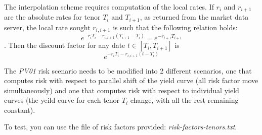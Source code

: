 \documentclass[10pt]{article}
\begin{document}
The interpolation scheme requires computation of the local rates. If $r_i$ and $r_{i+1}$ are the absolute rates for tenor $T_i$ and $T_{i+1}$, as returned from the market data server, the local rate sought $r_{i,i+1}$ is such that the following relation holds:
 $$e^{-r_iT_i-r_{i,i+1}(T_{i+1}-T_i)}=e^{-r_{i+1}T_{i+1}}$$.
Then the discount factor for any date $t \in [T_i,T_{i+1}]$ is $$e^{-r_i T_i-r_{i,i+1}(t-T_i)}$$

The \textit{PV01} risk scenario needs to be modified into 2 different scenarios, one that computes risk with respect to parallel shift of the yield curve (all risk factor move simultaneously) and one that computes risk with respect to individual yield curves (the yeild curve for each tenor $T_i$ change, with all the rest remaining constant).

To test, you can use the file of risk factors provided: \textit{risk-factors-tenors.txt}.
\end{document}
